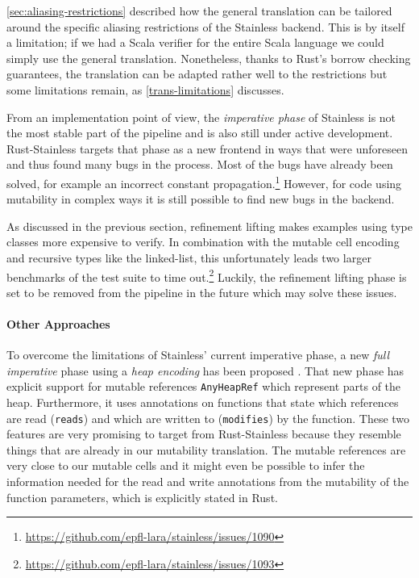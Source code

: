 \autoref{sec:aliasing-restrictions} described how the general translation can be
tailored around the specific aliasing restrictions of the Stainless backend.
This is by itself a limitation; if we had a Scala verifier for the entire Scala
language we could simply use the general translation. Nonetheless, thanks to
Rust's borrow checking guarantees, the translation can be adapted rather well to
the restrictions but some limitations remain, as \autoref{trans-limitations}
discusses.

From an implementation point of view, the \emph{imperative phase} of Stainless
is not the most stable part of the pipeline and is also still under active
development. Rust-Stainless targets that phase as a new frontend in ways that
were unforeseen and thus found many bugs in the process. Most of the bugs have
already been solved, for example an incorrect constant
propagation.\footnote{\url{https://github.com/epfl-lara/stainless/issues/1090}}
However, for code using mutability in complex ways it is still possible to find
new bugs in the backend.

As discussed in the previous section, refinement lifting makes examples using
type classes more expensive to verify. In combination with the mutable cell
encoding and recursive types like the linked-list, this unfortunately leads two
larger benchmarks of the test suite to time
out.\footnote{\url{https://github.com/epfl-lara/stainless/issues/1093}} Luckily,
the refinement lifting phase is set to be removed from the pipeline in the
future which may solve these issues.

\paragraph{Other Approaches}

To overcome the limitations of Stainless' current imperative phase, a
new \emph{full imperative} phase using a \emph{heap encoding} has been
proposed \cite{new-imperative}. That new phase has explicit support for
mutable references \passthrough{\lstinline!AnyHeapRef!} which represent
parts of the heap. Furthermore, it uses annotations on functions that
state which references are read (\passthrough{\lstinline!reads!}) and
which are written to (\passthrough{\lstinline!modifies!}) by the
function. These two features are very promising to target from
Rust-Stainless because they resemble things that are already in our
mutability translation. The mutable references are very close to our
mutable cells and it might even be possible to infer the information
needed for the read and write annotations from the mutability of the
function parameters, which is explicitly stated in Rust.


